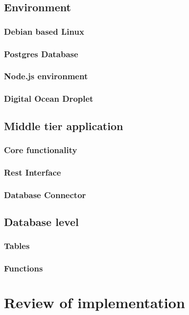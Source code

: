 \subsection{Environment}

\subsubsection{Debian based Linux}

\subsubsection{Postgres Database}

\subsubsection{Node.js environment}

\subsubsection{Digital Ocean Droplet}



\subsection{Middle tier application}

\subsubsection{Core functionality}

\subsubsection{Rest Interface}

\subsubsection{Database Connector}


\subsection{Database level}

\subsubsection{Tables}

\subsubsection{Functions}


\section{Review of implementation}